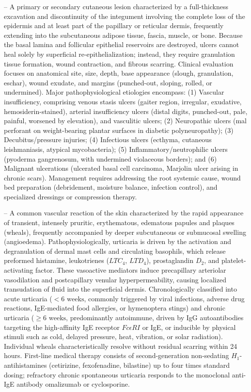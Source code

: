 -- A primary or secondary cutaneous lesion characterized by a full-thickness excavation and discontinuity of the integument involving the complete loss of the epidermis and at least part of the papillary or reticular dermis, frequently extending into the subcutaneous adipose tissue, fascia, muscle, or bone. Because the basal lamina and follicular epithelial reservoirs are destroyed, ulcers cannot heal solely by superficial re-epithelialization; instead, they require granulation tissue formation, wound contraction, and fibrous scarring. Clinical evaluation focuses on anatomical site, size, depth, base appearance (slough, granulation, eschar), wound exudate, and margins (punched-out, sloping, rolled, or undermined). Major pathophysiological etiologies encompass: (1) Vascular insufficiency, comprising venous stasis ulcers (gaiter region, irregular, exudative, hemosiderin-stained), arterial insufficiency ulcers (distal digits, punched-out, pale, painful, worsened by elevation), and vasculitic ulcers; (2) Neuropathic ulcers (mal perforant on weight-bearing plantar surfaces in diabetic polyneuropathy); (3) Decubitus/pressure injuries; (4) Infectious ulcers (ecthyma, cutaneous leishmaniasis, atypical mycobacteria); (5) Inflammatory/neutrophilic ulcers (pyoderma gangrenosum, with undermined violaceous borders); and (6) Malignant ulcerations (ulcerated basal cell carcinoma, Marjolin ulcer arising in chronic scars). Management requires addressing the root systemic cause, wound bed preparation (debridement, moisture balance, infection control), and specialized dressings or compression therapy.

-- A common vascular reaction of the skin characterized by the rapid appearance of transient, intensely pruritic, erythematous, edematous papules and plaques (wheals), frequently accompanied by deeper subcutaneous or submucosal swelling (angioedema). Pathophysiologically, urticaria is driven by the activation and degranulation of dermal mast cells and circulating basophils, which release preformed histamine, leukotrienes ($LTC_4$, $LTD_4$), prostaglandin $D_2$, and platelet-activating factor. These vasoactive mediators induce precapillary arteriolar vasodilation and postcapillary venular hyperpermeability, causing localized transudation of fluid into the superficial dermis. Chronologically classified into acute urticaria ($<6\text{ weeks}$, commonly triggered by viral infections, adverse drug reactions, IgE-mediated food allergies, or hymenoptera stings) and chronic urticaria ($\ge 6\text{ weeks}$, predominantly autoimmune, driven by IgG autoantibodies targeting the high-affinity IgE receptor $Fc\epsilon RI$ or IgE, or inducible by physical stimuli such as cold, delayed pressure, heat, vibration, or solar radiation). Individual wheals characteristically resolve without residual scarring within 24 hours. First-line medical therapy consists of second-generation non-sedating $H_1$-antihistamines (cetirizine, fexofenadine, bilastine) up to four times standard dosing; refractory chronic spontaneous urticaria responds to the monoclonal anti-IgE antibody omalizumab or cyclosporine.

